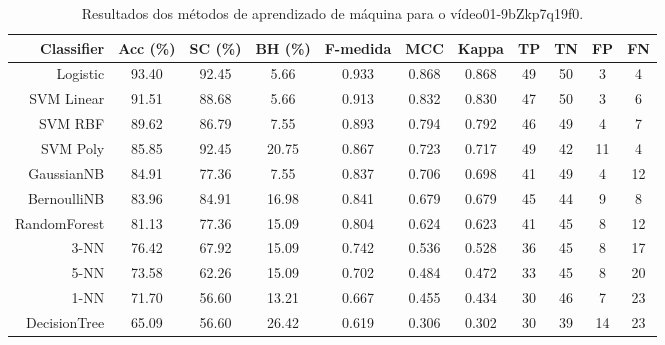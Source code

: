 \begin{table}[!htb]
\centering
\caption{Resultados dos métodos de aprendizado de máquina para o vídeo01-9bZkp7q19f0.}
\label{tab:01-9bZkp7q19f0}
\begin{tabular}{r|c|c|c|c|c|c|c|c|c|c}
\hline\hline
Classifier & Acc (\%) & SC (\%) & BH (\%) & F-medida & MCC & Kappa & TP & TN & FP & FN \\ \hline
Logistic & 93.40 & 92.45 & 5.66 & 0.933 & 0.868 & 0.868 & 49 & 50 & 3 & 4 \\ 
SVM Linear & 91.51 & 88.68 & 5.66 & 0.913 & 0.832 & 0.830 & 47 & 50 & 3 & 6 \\ 
SVM RBF & 89.62 & 86.79 & 7.55 & 0.893 & 0.794 & 0.792 & 46 & 49 & 4 & 7 \\ 
SVM Poly & 85.85 & 92.45 & 20.75 & 0.867 & 0.723 & 0.717 & 49 & 42 & 11 & 4 \\ 
GaussianNB & 84.91 & 77.36 & 7.55 & 0.837 & 0.706 & 0.698 & 41 & 49 & 4 & 12 \\ 
BernoulliNB & 83.96 & 84.91 & 16.98 & 0.841 & 0.679 & 0.679 & 45 & 44 & 9 & 8 \\ 
RandomForest & 81.13 & 77.36 & 15.09 & 0.804 & 0.624 & 0.623 & 41 & 45 & 8 & 12 \\ 
3-NN & 76.42 & 67.92 & 15.09 & 0.742 & 0.536 & 0.528 & 36 & 45 & 8 & 17 \\ 
5-NN & 73.58 & 62.26 & 15.09 & 0.702 & 0.484 & 0.472 & 33 & 45 & 8 & 20 \\ 
1-NN & 71.70 & 56.60 & 13.21 & 0.667 & 0.455 & 0.434 & 30 & 46 & 7 & 23 \\ 
DecisionTree & 65.09 & 56.60 & 26.42 & 0.619 & 0.306 & 0.302 & 30 & 39 & 14 & 23 \\ 
\hline\hline
\end{tabular}
\end{table}
